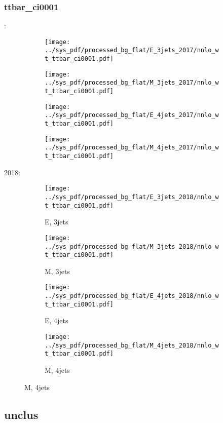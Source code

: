 \documentclass{beamer}
\begin{document}
\begin{frame}
\frametitle{ttbar_ci0001}
\fontsize{5}{1}:
\begin{figure}
\centering
\begin{subfigure}[b]{0.24\textwidth}
\texttt{[image: ../sys\_pdf/processed\_bg\_flat/E\_3jets\_2017/nnlo\_wt\_ttbar\_ci0001.pdf]}
\end{subfigure}
\begin{subfigure}[b]{0.24\textwidth}
\texttt{[image: ../sys\_pdf/processed\_bg\_flat/M\_3jets\_2017/nnlo\_wt\_ttbar\_ci0001.pdf]}
\end{subfigure}
\begin{subfigure}[b]{0.24\textwidth}
\texttt{[image: ../sys\_pdf/processed\_bg\_flat/E\_4jets\_2017/nnlo\_wt\_ttbar\_ci0001.pdf]}
\end{subfigure}
\begin{subfigure}[b]{0.24\textwidth}
\texttt{[image: ../sys\_pdf/processed\_bg\_flat/M\_4jets\_2017/nnlo\_wt\_ttbar\_ci0001.pdf]}
\end{subfigure}
\end{figure}
2018:
\begin{figure}
\centering
\begin{subfigure}[b]{0.24\textwidth}
\texttt{[image: ../sys\_pdf/processed\_bg\_flat/E\_3jets\_2018/nnlo\_wt\_ttbar\_ci0001.pdf]}
\captionsetup{font=tiny}
\caption{E, 3jets}
\end{subfigure}
\begin{subfigure}[b]{0.24\textwidth}
\texttt{[image: ../sys\_pdf/processed\_bg\_flat/M\_3jets\_2018/nnlo\_wt\_ttbar\_ci0001.pdf]}
\captionsetup{font=tiny}
\caption{M, 3jets}
\end{subfigure}
\begin{subfigure}[b]{0.24\textwidth}
\texttt{[image: ../sys\_pdf/processed\_bg\_flat/E\_4jets\_2018/nnlo\_wt\_ttbar\_ci0001.pdf]}
\captionsetup{font=tiny}
\caption{E, 4jets}
\end{subfigure}
\begin{subfigure}[b]{0.24\textwidth}
\texttt{[image: ../sys\_pdf/processed\_bg\_flat/M\_4jets\_2018/nnlo\_wt\_ttbar\_ci0001.pdf]}
\captionsetup{font=tiny}
\caption{M, 4jets}
\end{subfigure}
\end{figure}
\end{frame}


\subsection{unclus}
\end{document}

